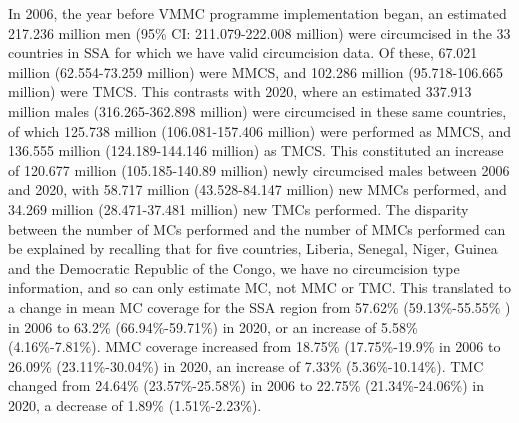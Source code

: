 \documentclass{article}
\begin{document}
In 2006, the year before VMMC programme implementation began, an estimated 217.236 million men (95\%
CI: 211.079-222.008 million) were circumcised in the 33 countries in SSA for which we have valid circumcision
data. 
Of these, 67.021 million (62.554-73.259 million) were MMCS, and 102.286 million (95.718-106.665
million) were TMCS. 
This contrasts with 2020, where an estimated 337.913 million males (316.265-362.898
million) were circumcised in these same countries, of which 125.738 million (106.081-157.406 million) were
performed as MMCS, and 136.555 million (124.189-144.146 million) as TMCS. 
This constituted an increase
of 120.677 million (105.185-140.89 million) newly circumcised males between 2006 and 2020, with 58.717
million (43.528-84.147 million) new MMCs performed, and 34.269 million (28.471-37.481 million) new
TMCs performed. 
The disparity between the number of MCs performed and the number of MMCs performed
can be explained by recalling that for five countries, Liberia, Senegal, Niger, Guinea and the Democratic
Republic of the Congo, we have no circumcision type information, and so can only estimate MC, not MMC or
TMC. 
This translated to a change in mean MC coverage for the SSA region from 57.62\% (59.13\%-55.55\%
) in 2006 to 63.2\% (66.94\%-59.71\%) in 2020, or an increase of 5.58\% (4.16\%-7.81\%). 
MMC coverage increased from 18.75\% (17.75\%-19.9\%  in 2006 to 26.09\% (23.11\%-30.04\%) in 2020, an increase of 7.33\%
(5.36\%-10.14\%). 
TMC changed from 24.64\% (23.57\%-25.58\%) in 2006 to 22.75\% (21.34\%-24.06\%) in 2020, a decrease of 1.89\% (1.51\%-2.23\%).
\end{document}
